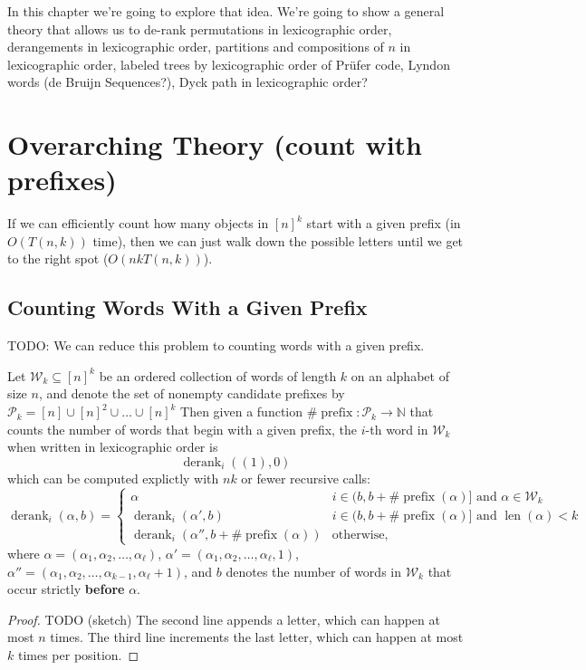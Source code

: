 In this chapter we're going to explore that idea. We're going to show a general
theory that allows us to de-rank
permutations in lexicographic order,
derangements in lexicographic order,
partitions and compositions of $n$ in lexicographic order,
labeled trees by lexicographic order of Pr\"ufer code,
Lyndon words \cite{Kociumaka2014} (de Bruijn Sequences?),
Dyck path in lexicographic order?
\section{Overarching Theory (count with prefixes)}
If we can efficiently count how many objects in
$[n]^k$ start with a given prefix
(in $O(T(n,k))$ time),
then we can just walk down the possible letters until
we get to the right spot ($O(nkT(n,k))$).

\subsection{Counting Words With a Given Prefix}
TODO: We can reduce this problem to counting words with a given prefix.
\begin{lemma}
  Let $\mathcal{W}_k \subseteq [n]^k$ be an ordered collection of words of
  length $k$ on an alphabet of size $n$, and denote the set of nonempty candidate
  prefixes by
  $\mathcal{P}_k = [n] \cup [n]^2 \cup \dots \cup [n]^k$
  Then given a function
  $\#\operatorname{prefix}\colon \mathcal{P}_k \rightarrow \mathbb{N}$ that
  counts the number of words that begin with a given prefix, the $i$-th word
  in $\mathcal{W}_k$ when written in lexicographic order is \[
    \operatorname{derank}_i((1), 0)
  \] which can be computed explictly with $nk$ or fewer recursive calls:
\begin{equation}
  \operatorname{derank}_i(\alpha, b) = \begin{cases}
    \alpha
      & i \in (b, b + \#\operatorname{prefix}(\alpha)] \text{ and } \alpha \in \mathcal{W}_k \\
    \operatorname{derank}_i(\alpha', b)
      & i \in (b, b + \#\operatorname{prefix}(\alpha)] \text{ and } \operatorname{len}(\alpha) < k \\
    \operatorname{derank}_i(\alpha'', b + \#\operatorname{prefix}(\alpha))
      & \text{otherwise},
  \end{cases}
\end{equation}
where
$\alpha = (\alpha_1, \alpha_2, \dots, \alpha_\ell)$,
$\alpha' = (\alpha_1, \alpha_2, \dots, \alpha_\ell, 1)$,
$\alpha'' = (\alpha_1, \alpha_2, \dots, \alpha_{k-1}, \alpha_\ell + 1)$,
and $b$ denotes the number of words in $\mathcal{W}_k$ that occur strictly
\textbf{before} $\alpha$.
\end{lemma}
\begin{proof}
  TODO (sketch)
  The second line appends a letter, which can happen at most $n$ times.
  The third line increments the last letter, which can happen at most $k$ times
  per position.
\end{proof}


